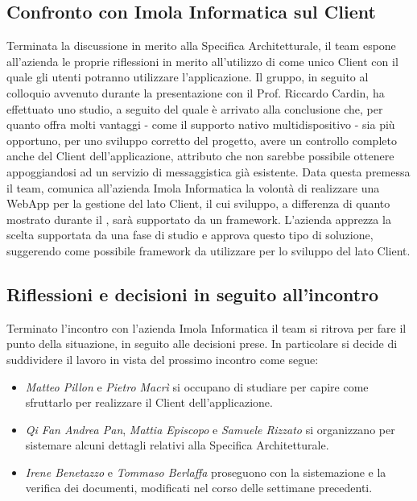 \subsection{Confronto con Imola Informatica sul Client}
Terminata la discussione in merito alla Specifica Architetturale, il team espone all'azienda le proprie riflessioni in merito all'utilizzo di  come unico Client con il quale gli utenti potranno utilizzare l'applicazione. \newline
Il gruppo, in seguito al colloquio avvenuto durante la presentazione  con il Prof. Riccardo Cardin, ha effettuato uno studio, a seguito del quale è arrivato alla conclusione che, per quanto  offra molti vantaggi - come il supporto nativo multidispositivo - sia più opportuno, per uno sviluppo corretto del progetto, avere un controllo completo anche del Client dell'applicazione, attributo che non sarebbe possibile ottenere appoggiandosi ad un servizio di messaggistica già esistente. \newline
Data questa premessa il team, comunica all'azienda Imola Informatica la volontà di realizzare una WebApp per la gestione del lato Client, il cui sviluppo, a differenza di quanto mostrato durante il , sarà supportato da un framework. 
L'azienda apprezza la scelta supportata da una fase di studio e approva questo tipo di soluzione, suggerendo  come possibile framework da utilizzare per lo sviluppo del lato Client. 

\newpage
\subsection{Riflessioni e decisioni in seguito all'incontro}
Terminato l'incontro con l'azienda Imola Informatica il team si ritrova per fare il punto della situazione, in seguito alle decisioni prese. In particolare si decide di suddividere il lavoro in vista del prossimo incontro come segue: 
\begin{itemize}
    \item \textit{Matteo Pillon} e \textit{Pietro Macrì} si occupano di studiare  per capire come sfruttarlo per realizzare il Client dell'applicazione. 
    \item \textit{Qi Fan Andrea Pan}, \textit{Mattia Episcopo} e \textit{Samuele Rizzato} si organizzano per sistemare alcuni dettagli relativi alla Specifica Architetturale.
    \item \textit{Irene Benetazzo} e \textit{Tommaso Berlaffa} proseguono con la sistemazione e la verifica dei documenti, modificati nel corso delle settimane precedenti.
\end{itemize}